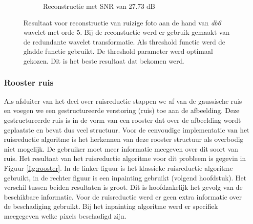 \begin{figure}
\begin{subfigure}[b]{0.4\textwidth}
        \caption{Reconstructie met SNR van 27.73 dB}
        \label{fig:redundant_fixed}
    \end{subfigure}
    \caption{Resultaat voor reconstructie van ruizige foto aan de hand van  \textit{db6} wavelet met orde 5. Bij de reconstuctie werd er gebruik gemaakt van de redundante wavelet transformatie. Als threshold functie werd de gladde functie gebruikt. De threshold parameter werd optimaal gekozen. Dit is het beste resultaat dat bekomen werd. }\label{fig:redundant}
\end{figure}


\subsubsection{Rooster ruis}


Als afsluiter van het deel over ruisreductie stappen we af van de gaussische ruis en voegen we een gestructureerde verstoring (ruis) toe aan de afbeelding.
Deze gestructureerde ruis is in de vorm van een rooster dat over de afbeelding wordt geplaatste en bevat dus veel structuur.
Voor de eenvoudige implementatie van het ruisreductie algoritme is het herkennen van deze rooster structuur als overbodig niet mogelijk.
De gebruiker moet meer informatie meegeven over dit soort van ruis.
Het resultaat van het ruisreductie algoritme voor dit probleem is gegevin in Figuur \ref{fig:rooster}.
In de linker figuur is het klassieke ruisreductie algoritme gebruikt, in de rechter figuur is een inpainting gebruikt (volgend hoofdstuk).
Het verschil tussen beiden resultaten is groot.
Dit is hoofdzakelijk het gevolg van de beschikbare informatie.
Voor de ruisreductie werd er geen extra informatie over de beschadiging gebruikt.
Bij het inpainting algoritme werd er specifiek meegegeven welke pixels beschadigd zijn.


